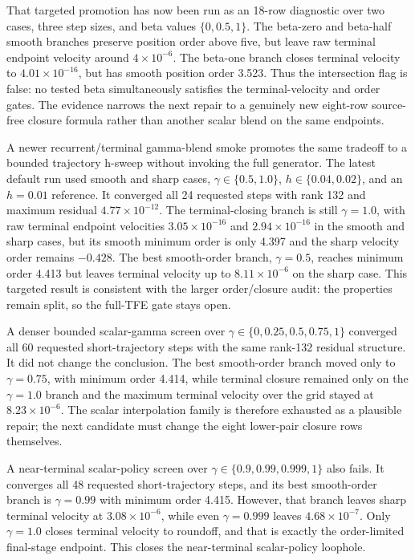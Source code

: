 \documentclass[11pt]{article}
\newcommand{\tfe}{TFE}
\begin{document}
That targeted promotion has now been run as an 18-row diagnostic over two
cases, three step sizes, and beta values $\{0,0.5,1\}$.  The beta-zero and
beta-half smooth branches preserve position order above five, but leave raw
terminal endpoint velocity around $4\times10^{-6}$.  The beta-one branch closes
terminal velocity to $4.01\times10^{-16}$, but has smooth position order 3.523.
Thus the intersection flag is false: no tested beta simultaneously satisfies
the terminal-velocity and order gates.  The evidence narrows the next repair to
a genuinely new eight-row source-free closure formula rather than another
scalar blend on the same endpoints.

A newer recurrent/terminal gamma-blend smoke promotes the same tradeoff to a
bounded trajectory h-sweep without invoking the full generator.  The latest
default run used smooth and sharp cases, $\gamma\in\{0.5,1.0\}$,
$h\in\{0.04,0.02\}$, and an $h=0.01$ reference.  It converged all 24 requested
steps with rank 132 and maximum residual $4.77\times10^{-12}$.  The
terminal-closing branch is still $\gamma=1.0$, with raw terminal endpoint
velocities $3.05\times10^{-16}$ and $2.94\times10^{-16}$ in the smooth and
sharp cases, but its smooth minimum order is only 4.397 and the sharp velocity
order remains $-0.428$.  The best smooth-order branch, $\gamma=0.5$, reaches
minimum order 4.413 but leaves terminal velocity up to $8.11\times10^{-6}$ on
the sharp case.  This targeted result is consistent with the larger
order/closure audit: the properties remain split, so the full-\tfe{} gate stays
open.

A denser bounded scalar-gamma screen over
$\gamma\in\{0,0.25,0.5,0.75,1\}$ converged all 60 requested short-trajectory
steps with the same rank-132 residual structure.  It did not change the
conclusion.  The best smooth-order branch moved only to $\gamma=0.75$, with
minimum order 4.414, while terminal closure remained only on the
$\gamma=1.0$ branch and the maximum terminal velocity over the grid stayed at
$8.23\times10^{-6}$.  The scalar interpolation family is therefore exhausted
as a plausible repair; the next candidate must change the eight lower-pair
closure rows themselves.

A near-terminal scalar-policy screen over
$\gamma\in\{0.9,0.99,0.999,1\}$ also fails.  It converges all 48 requested
short-trajectory steps, and its best smooth-order branch is $\gamma=0.99$ with
minimum order 4.415.  However, that branch leaves sharp terminal velocity at
$3.08\times10^{-6}$, while even $\gamma=0.999$ leaves
$4.68\times10^{-7}$.  Only $\gamma=1.0$ closes terminal velocity to roundoff,
and that is exactly the order-limited final-stage endpoint.  This closes the
near-terminal scalar-policy loophole.
\end{document}
